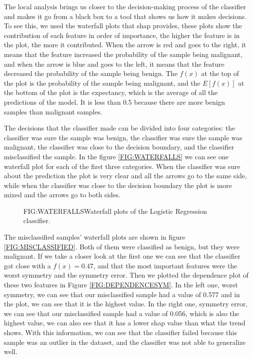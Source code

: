 The local analysis brings us closer to the decision-making process of the classifier and makes it go from a black box to a tool that shows us how it makes decisions.
To see this, we used the waterfall plots that \ac{shap} provides, these plots show the contribution of each feature in order of importance, the higher the feature is in the plot, the more it contributed. When the arrow is red and goes to the right, it means that the feature increased the probability of the sample being malignant, and when the arrow is blue and goes to the left, it means that the feature decreased the probability of the sample being benign. The $f(x)$ at the top of the plot is the probability of the sample being malignant, and the $E[f(x)]$ at the bottom of the plot is the expectancy, which is the average of all the predictions of the model. It is less than 0.5 because there are more benign samples than malignant samples. 

The decisions that the classifier made can be divided into four categories: the classifier was sure the sample was benign, the classifier was sure the sample was malignant, the classifier was close to the decision boundary, and the classifier misclassified the sample. In the figure \ref{FIG:WATERFALLS} we can see one waterfall plot for each of the first three categories. When the classifier was sure about the prediction the plot is very clear and all the arrows go to the same side, while when the classifier was close to the decision boundary the plot is more mixed and the arrows go to both sides.

\begin{figure}[Waterfall Plots]{FIG:WATERFALLS}{Waterfall plots of the Logistic Regression classifier.}
\end{figure}

The misclassified samples' waterfall plots are shown in figure \ref{FIG:MISCLASSIFIED}. Both of them were classified as benign, but they were malignant. If we take a closer look at the first one we can see that the classifier got close with a $f(x) = 0.47$, and that the most important features were the worst symmetry and the symmetry error. Then we plotted the dependence plot of these two features in Figure \ref{FIG:DEPENDENCESYM}. In the left one, worst symmetry, we can see that our misclassified sample had a value of 0.577 and in the plot, we can see that it is the highest value. In the right one, symmetry error, we can see that our misclassified sample had a value of 0.056, which is also the highest value, we can also see that it has a lower \ac{shap} value than what the trend shows. With this information, we can see that the classifier failed because this sample was an outlier in the dataset, and the classifier was not able to generalize well.


